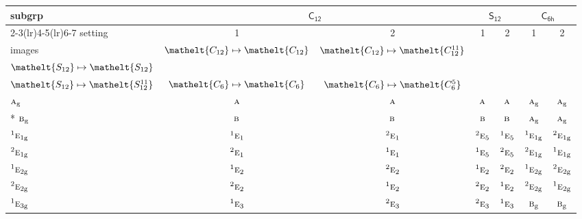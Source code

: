\documentclass[10pt,a4paper]{article}
\numberwithin{equation}{section}
\newcommand{\eltfont}[1]{{\let\sigma\eltsigma\mathelt{#1}}}
\newcommand{\grp}[1]{\mathsf{#1}}
\newcommand{\irr}[1]{\text{\normalfont\scshape #1}}
\newcommand{\conjpair}[1]{{}^{#1}}
\newcommand{\cls}[1]{\eltfont{#1}}
\newcommand{\ptag}[1]{\mathrm{#1}}
\begin{document}
{\small\begin{longtable}{@{}lcccccc@{}}\toprule
subgrp & \multicolumn{2}{c}{\href{C12.pdf}{$\grp{C_{12}}$}} & \multicolumn{2}{c}{\href{S12.pdf}{$\grp{S_{12}}$}} & \multicolumn{2}{c}{\href{C6h.pdf}{$\grp{C_{6h}}$}}\\\cmidrule(lr){2-3}\cmidrule(lr){4-5}\cmidrule(lr){6-7}
setting & 1 & 2 & 1 & 2 & 1 & 2\\
images & {\scriptsize $\cls{C_{12}} \mapsto \cls{C_{12}}$} & {\scriptsize $\cls{C_{12}} \mapsto \cls{C_{12}^{11}}$} & {\scriptsize\begin{tabular}[t]{@{}c@{}}$\cls{C_{6}} \mapsto \cls{C_{6}}$\\$\cls{S_{12}} \mapsto \cls{S_{12}}$\end{tabular}} & {\scriptsize\begin{tabular}[t]{@{}c@{}}$\cls{C_{6}} \mapsto \cls{C_{6}^{5}}$\\$\cls{S_{12}} \mapsto \cls{S_{12}^{11}}$\end{tabular}} & {\scriptsize $\cls{C_{6}} \mapsto \cls{C_{6}}$} & {\scriptsize $\cls{C_{6}} \mapsto \cls{C_{6}^{5}}$}\\\midrule\endhead
\bottomrule\endfoot\endlastfoot
$\irr{a}_{\ptag{g}}$ & $\irr{a}$ & $\irr{a}$ & $\irr{a}$ & $\irr{a}$ & $\irr{a}_{\ptag{g}}$ & $\irr{a}_{\ptag{g}}$\\*
$\irr{b}_{\ptag{g}}$ & $\irr{b}$ & $\irr{b}$ & $\irr{b}$ & $\irr{b}$ & $\irr{a}_{\ptag{g}}$ & $\irr{a}_{\ptag{g}}$\\
$\conjpair{1}\irr{e}_{1\ptag{g}}$ & $\conjpair{1}\irr{e}_{1}$ & $\conjpair{2}\irr{e}_{1}$ & $\conjpair{2}\irr{e}_{5}$ & $\conjpair{1}\irr{e}_{5}$ & $\conjpair{1}\irr{e}_{1\ptag{g}}$ & $\conjpair{2}\irr{e}_{1\ptag{g}}$\\
$\conjpair{2}\irr{e}_{1\ptag{g}}$ & $\conjpair{2}\irr{e}_{1}$ & $\conjpair{1}\irr{e}_{1}$ & $\conjpair{1}\irr{e}_{5}$ & $\conjpair{2}\irr{e}_{5}$ & $\conjpair{2}\irr{e}_{1\ptag{g}}$ & $\conjpair{1}\irr{e}_{1\ptag{g}}$\\
$\conjpair{1}\irr{e}_{2\ptag{g}}$ & $\conjpair{1}\irr{e}_{2}$ & $\conjpair{2}\irr{e}_{2}$ & $\conjpair{1}\irr{e}_{2}$ & $\conjpair{2}\irr{e}_{2}$ & $\conjpair{1}\irr{e}_{2\ptag{g}}$ & $\conjpair{2}\irr{e}_{2\ptag{g}}$\\
$\conjpair{2}\irr{e}_{2\ptag{g}}$ & $\conjpair{2}\irr{e}_{2}$ & $\conjpair{1}\irr{e}_{2}$ & $\conjpair{2}\irr{e}_{2}$ & $\conjpair{1}\irr{e}_{2}$ & $\conjpair{2}\irr{e}_{2\ptag{g}}$ & $\conjpair{1}\irr{e}_{2\ptag{g}}$\\
$\conjpair{1}\irr{e}_{3\ptag{g}}$ & $\conjpair{1}\irr{e}_{3}$ & $\conjpair{2}\irr{e}_{3}$ & $\conjpair{2}\irr{e}_{3}$ & $\conjpair{1}\irr{e}_{3}$ & $\irr{b}_{\ptag{g}}$ & $\irr{b}_{\ptag{g}}$\\

\end{longtable}}
\end{document}
